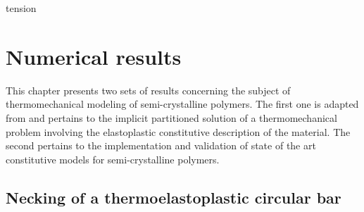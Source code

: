tension\chapter{Numerical results} \label{ch:numerical_results}

This chapter presents two sets of results concerning the subject of thermomechanical modeling of semi-crystalline polymers.
The first one is adapted from \cite{vila-chaNumericalAssessmentPartitioned2023a} and pertains to the implicit partitioned solution of a thermomechanical problem involving the elastoplastic constitutive description of the material.
The second pertains to the implementation and validation of state of the art constitutive models for semi-crystalline polymers.

\section{Necking of a thermoelastoplastic circular bar}
     \label{sec:mech-driv-probl}

